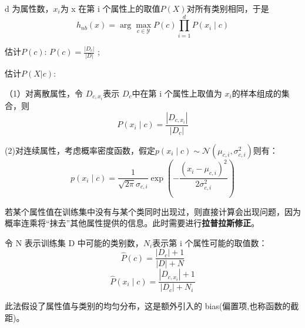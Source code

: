 d 为属性数，$x_{i}$为 x 在第 i 个属性上的取值$P(X)$对所有类别相同，于是 
\begin{equation}h_{nb}(x)=\arg\max_{c\in\mathcal{Y}}P(c)\prod_{i=1}^dP(x_i\mid c)\end{equation}

估计$P(c)$: $P(c)=\frac{|D_c|}{|D|}$ ;

估计$P(X|c)$:

（1）对离散属性，令  $D_{c,x_{i}}$表示 $D_{c}$中在第 i 个属性上取值为 $x_{i}$的样本组成的集合，则 
\begin{equation}P(x_i\mid c)=\frac{|D_{c,x_i}|}{|D_c|}\end{equation}

(2)对连续属性，考虑概率密度函数，假定$p(x_i\mid c)\sim\mathcal{N}(\mu_{c,i},\sigma_{c,i}^2)$则有：
\begin{equation}p(x_i\mid c)=\frac{1}{\sqrt{2\pi}\sigma_{c,i}}\exp\left(-\frac{(x_i-\mu_{c,i})^2}{2\sigma_{c,i}^2}\right)\end{equation}

若某个属性值在训练集中没有与某个类同时出现过，则直接计算会出现问题，因为概率连乘将“抹去”其他属性提供的信息。此时需要进行\textbf{拉普拉斯修正}。

令 N 表示训练集 D 中可能的类别数，$N_{i}$表示第 i 个属性可能的取值数： 
\begin{equation}\hat{P}(c)=\frac{|D_c|+1}{|D|+N}\end{equation}
\begin{equation}\hat{P}(x_i\mid c)=\frac{|D_{c,x_i}|+1}{|D_c|+N_i}\end{equation}

此法假设了属性值与类别的均匀分布，这是额外引入的 bias(偏置项,也称函数的截距)。